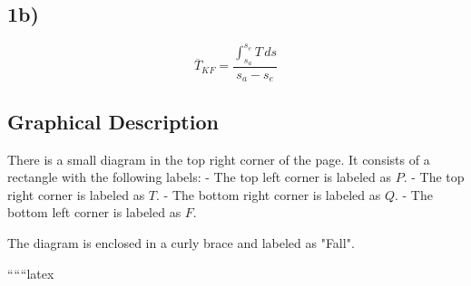 

\subsection*{1b)}
\[
\overline{T}_{KF} = \frac{\int_{s_a}^{s_e} T \, ds}{s_a - s_e}
\]

\subsection*{Graphical Description}
There is a small diagram in the top right corner of the page. It consists of a rectangle with the following labels:
- The top left corner is labeled as $P$.
- The top right corner is labeled as $T$.
- The bottom right corner is labeled as $Q$.
- The bottom left corner is labeled as $F$.

The diagram is enclosed in a curly brace and labeled as "Fall".

``````latex